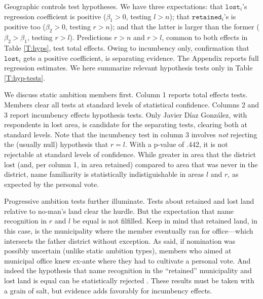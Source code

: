 \documentclass[letter,12pt]{article}
\begin{document}
Geographic controls test hypotheses. We have three expectations: that $\texttt{lost}_i$'s regression coefficient is positive ($\beta_1>0$, testing $l>n$); that $\texttt{retained}_i$'s is positive too ($\beta_2>0$, testing $r>n$); and that the latter is larger than the former ($\beta_2>\beta_1$, testing $r>l$). Predictions $r>n$ and $r>l$, common to both effects in Table \ref{T:hyps}, test total effects. Owing to incumbency only, confirmation that $\texttt{lost}_i$ gets a positive coefficient, is separating evidence. The Appendix reports full regression estimates. We here summarize relevant hypothesis tests only in Table \ref{T:hyp-tests}.

We discuss static ambition members first. Column 1 reports total effects tests. Members clear all tests at standard levels of statistical confidence. Columns 2 and 3 report incumbency effects hypothesis tests. Only Javier Díaz González, with respondents in lost area, is candidate for the separating tests, clearing both at standard levels. Note that the incumbency test in column 3 involves \emph{not} rejecting the (usually null) hypothesis that $r=l$. With a p-value of .442, it is not rejectable at standard levels of confidence. While greater in area that the district lost (and, per column 1, in area retained) compared to area that was never in the district, name familiarity is statistically indistiguishable in areas $l$ and $r$, as expected by the personal vote. 

Progressive ambition tests further illuminate. Tests about retained and lost land relative to no-man's land clear the hurdle. But the expectation that name recognition in $r$ and $l$ be equal is not filfilled. Keep in mind that retained land, in this case, is the municipality where the member eventually ran for office---which intersects the father district without exception. As said, if nomination was possibly uncertain (unlike static ambition types), members who aimed at municipal office knew ex-ante where they had to cultivate a personal vote. And indeed the hypothesis that name recognition in the ``retained'' municipality and lost land is equal can be statistically rejected \citep[cf.][]{lucardi.micozzi.Career-argentina.2016}. These results must be taken with a grain of salt, but evidence adds favorably for incumbency effects.  
\end{document}
